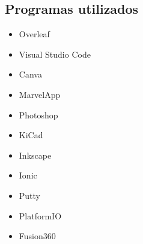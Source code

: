                 \subsection{Programas utilizados}
                    \begin{itemize} [label=•]
                        \setlength{\itemindent}{2.5em}
                            \item Overleaf
                            \item Visual Studio Code
                            \item Canva
                            \item MarvelApp
                            \item Photoshop
                            \item KiCad
                            \item Inkscape
                            \item Ionic
                            \item Putty
                            \item PlatformIO
                            \item Fusion360
                    \end{itemize}